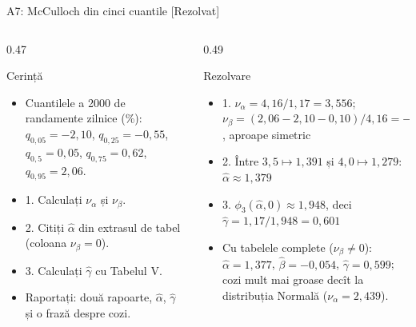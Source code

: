\begin{frame}{A7: McCulloch din cinci cuantile [Rezolvat]}
\itemsize{\scriptsize}
\begin{columns}[T]
\begin{column}{0.47\textwidth}
\begin{block}{Cerință}
\begin{itemize}
    \item Cuantilele a 2000 de randamente zilnice (\%): $q_{0{,}05} = -2{,}10$, $q_{0{,}25} = -0{,}55$, $q_{0{,}5} = 0{,}05$, $q_{0{,}75} = 0{,}62$, $q_{0{,}95} = 2{,}06$.
    \item 1. Calculați $\nu_\alpha$ și $\nu_\beta$.
    \item 2. Citiți $\hat\alpha$ din extrasul de tabel (coloana $\nu_\beta = 0$).
    \item 3. Calculați $\hat\gamma$ cu Tabelul V.
    \item Raportați: două rapoarte, $\hat\alpha$, $\hat\gamma$ și o frază despre cozi.
\end{itemize}
\end{block}
\end{column}
\begin{column}{0.49\textwidth}
\begin{exampleblock}{Rezolvare}
\begin{itemize}
    \item 1. $\nu_\alpha = 4{,}16/1{,}17 = 3{,}556$; $\nu_\beta = (2{,}06 - 2{,}10 - 0{,}10)/4{,}16 = -0{,}034$, aproape simetric
    \item 2. Între $3{,}5 \mapsto 1{,}391$ și $4{,}0 \mapsto 1{,}279$: $\hat\alpha \approx 1{,}379$
    \item 3. $\phi_3(\hat\alpha, 0) \approx 1{,}948$, deci $\hat\gamma = 1{,}17/1{,}948 = 0{,}601$
    \item Cu tabelele complete ($\nu_\beta \ne 0$): $\hat\alpha = 1{,}377$, $\hat\beta = -0{,}054$, $\hat\gamma = 0{,}599$; cozi mult mai groase decît la distribuția Normală ($\nu_\alpha = 2{,}439$).
\end{itemize}
\end{exampleblock}
\end{column}
\end{columns}
\end{frame}

